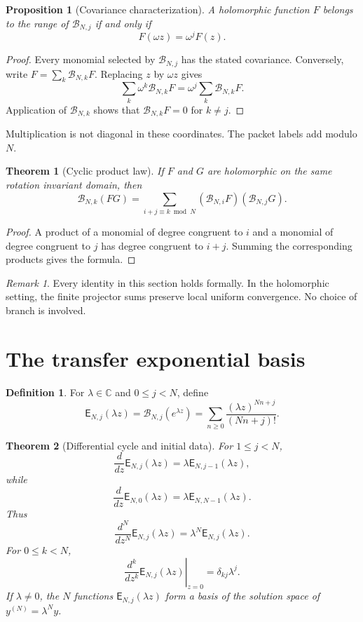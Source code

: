 \documentclass{aomart}
\newtheorem{theorem}{Theorem}[section]
\newtheorem{proposition}[proposition]{Proposition}
\theoremstyle{definition}
\newtheorem{definition}[definition]{Definition}
\theoremstyle{remark}
\newtheorem{remark}[remark]{Remark}
\newcommand{\CC}{\mathbb C}
\newcommand{\Bcal}{\mathcal B}
\newcommand{\Efun}{\mathsf E}
\begin{document}
\begin{proposition}[Covariance characterization]\label{prop:covariance}
A holomorphic function $F$ belongs to the range of $\Bcal_{N,j}$ if and only if
\[
F(\omega z)=\omega^jF(z).
\]
\end{proposition}

\begin{proof}
Every monomial selected by $\Bcal_{N,j}$ has the stated covariance.  Conversely, write $F=\sum_k\Bcal_{N,k}F$.  Replacing $z$ by $\omega z$ gives
\[
\sum_k\omega^k\Bcal_{N,k}F
=
\omega^j\sum_k\Bcal_{N,k}F.
\]
Application of $\Bcal_{N,k}$ shows that $\Bcal_{N,k}F=0$ for $k\ne j$.
\end{proof}

Multiplication is not diagonal in these coordinates.  The packet labels add modulo $N$.

\begin{theorem}[Cyclic product law]\label{thm:cyclic_product}
If $F$ and $G$ are holomorphic on the same rotation invariant domain, then
\[
\Bcal_{N,k}(FG)
=
\sum_{i+j\equiv k\bmod N}
(\Bcal_{N,i}F)(\Bcal_{N,j}G).
\]
\end{theorem}

\begin{proof}
A product of a monomial of degree congruent to $i$ and a monomial of degree congruent to $j$ has degree congruent to $i+j$.  Summing the corresponding products gives the formula.
\end{proof}

\begin{remark}\label{rem:formal_analytic}
Every identity in this section holds formally.  In the holomorphic setting, the finite projector sums preserve local uniform convergence.  No choice of branch is involved.
\end{remark}

\section{The transfer exponential basis}\label{sec:transfer_exponential}

\begin{definition}\label{def:transfer_exponential}
For $\lambda\in\CC$ and $0\leq j<N$, define
\[
\Efun_{N,j}(\lambda z)
=
\Bcal_{N,j}(e^{\lambda z})
=
\sum_{n\geq0}\frac{(\lambda z)^{Nn+j}}{(Nn+j)!}.
\]
\end{definition}

\begin{theorem}[Differential cycle and initial data]\label{thm:exponential_cycle}
For $1\leq j<N$,
\[
\frac{d}{dz}\Efun_{N,j}(\lambda z)
=
\lambda\Efun_{N,j-1}(\lambda z),
\]
while
\[
\frac{d}{dz}\Efun_{N,0}(\lambda z)
=
\lambda\Efun_{N,N-1}(\lambda z).
\]
Thus
\[
\frac{d^N}{dz^N}\Efun_{N,j}(\lambda z)
=
\lambda^N\Efun_{N,j}(\lambda z).
\]
For $0\leq k<N$,
\[
\left.\frac{d^k}{dz^k}\Efun_{N,j}(\lambda z)\right|_{z=0}
=
\delta_{kj}\lambda^j.
\]
If $\lambda\ne0$, the $N$ functions $\Efun_{N,j}(\lambda z)$ form a basis of the solution space of $y^{(N)}=\lambda^Ny$.
\end{theorem}
\end{document}
